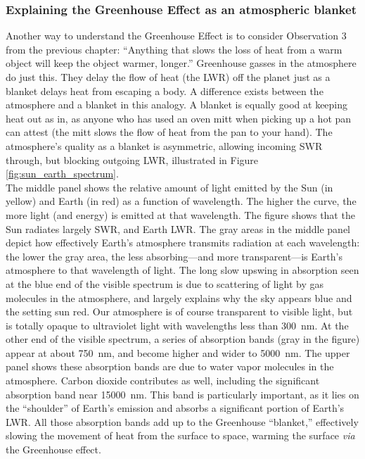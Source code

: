 \subsubsection{Explaining the Greenhouse Effect as an atmospheric blanket}
Another way to understand the Greenhouse Effect is to consider Observation 3 from the previous chapter: ``Anything that slows the loss of heat from a warm object will keep the object warmer, longer.'' Greenhouse gasses in the atmosphere do just this. They delay the flow of heat (the LWR) off the planet just as a blanket delays heat from escaping a body. A difference exists between the atmosphere and a blanket in this analogy. A blanket is equally good at keeping heat out as in, as anyone who has used an oven mitt when picking up a hot pan can attest (the mitt slows the flow of heat from the pan to your hand). The atmosphere's quality as a blanket is asymmetric, allowing incoming SWR through, but blocking outgoing LWR, illustrated in Figure \ref{fig:sun_earth_spectrum}.\\
The middle panel shows the relative amount of light emitted by the Sun (in yellow) and Earth (in red) as a function of wavelength. The higher the curve, the more light (and energy) is emitted at that wavelength. The figure shows that the Sun radiates largely SWR, and Earth LWR. The gray areas in the middle panel depict how effectively Earth's atmosphere transmits radiation at each wavelength: the lower the gray area, the less absorbing---and more transparent---is Earth's atmosphere to that wavelength of light. The long slow upswing in absorption seen at the blue end of the visible spectrum is due to scattering of light by gas molecules in the atmosphere, and largely explains why the sky appears blue and the setting sun red. Our atmosphere is of course transparent to visible light, but is totally opaque to ultraviolet light with wavelengths less than \SI{300}{\nano\metre}. At the other end of the visible spectrum, a series of absorption bands (gray in the figure) appear at about \SI{750}{\nano\metre}, and become higher and wider to \SI{5000}{\nano\metre}. The upper panel shows these absorption bands are due to water vapor molecules in the atmosphere. Carbon dioxide contributes as well, including the significant absorption band near \SI{15000}{\nano\metre}. This band is particularly important, as it lies on the ``shoulder'' of Earth's emission and absorbs a significant portion of Earth's LWR. All those absorption bands add up to the Greenhouse ``blanket,'' effectively slowing the movement of heat from the surface to space, warming the surface \textit{via} the Greenhouse effect.\\

